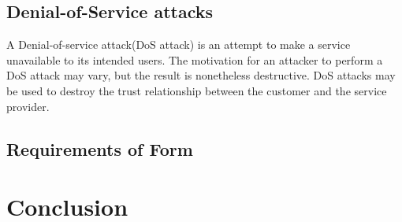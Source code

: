 \documentclass[a4paper,11pt]{article}
\begin{document}
\subsection{Denial-of-Service attacks}
A Denial-of-service attack(DoS attack) is an attempt to make a service unavailable to its intended users. The motivation for an attacker to perform a DoS attack may vary, but the result is nonetheless destructive. DoS attacks may be used to destroy the trust relationship between the customer and the service provider.
\subsection{Requirements of Form}


\section{Conclusion}
\end{document}
